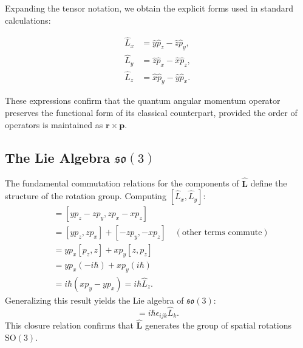 Expanding the tensor notation, we obtain the explicit forms used in standard
calculations:

\begin{align}
  \hat{L}_x &= \hat{y}\hat{p}_z - \hat{z}\hat{p}_y, \\
  \hat{L}_y &= \hat{z}\hat{p}_x - \hat{x}\hat{p}_z, \\
  \hat{L}_z &= \hat{x}\hat{p}_y - \hat{y}\hat{p}_x.
\end{align}

These expressions confirm that the quantum angular momentum operator preserves
the functional form of its classical counterpart, provided the order of
operators is maintained as $\mathbf{r} \times \mathbf{p}$.

\subsection{The Lie Algebra \texorpdfstring{$\mathfrak{so}(3)$}{so(3)}}

The fundamental commutation relations for the components of $\hat{\mathbf{L}}$
define the structure of the rotation group. Computing $[\hat{L}_x, \hat{L}_y]$:
\begin{align}
  [\hat{L}_x, \hat{L}_y] &= [y p_z - z p_y, z p_x - x p_z] \nonumber \\
                         &= [y p_z, z p_x] + [-z p_y, -x p_z] \quad
                         (\text{other terms commute}) \nonumber \\
                         &= y p_x [p_z, z] + x p_y [z, p_z] \nonumber \\
                         &= y p_x (-i\hbar) + x p_y (i\hbar) \nonumber \\
                         &= i\hbar (x p_y - y p_x) = i\hbar \hat{L}_z.
\end{align}
Generalizing this result yields the Lie algebra of $\mathfrak{so}(3)$:
\begin{equation}
  [\hat{L}_i, \hat{L}_j] = i\hbar \epsilon_{ijk} \hat{L}_k.
\end{equation}
This closure relation confirms that $\hat{\mathbf{L}}$ generates the group of
spatial rotations $\mathrm{SO}(3)$.
